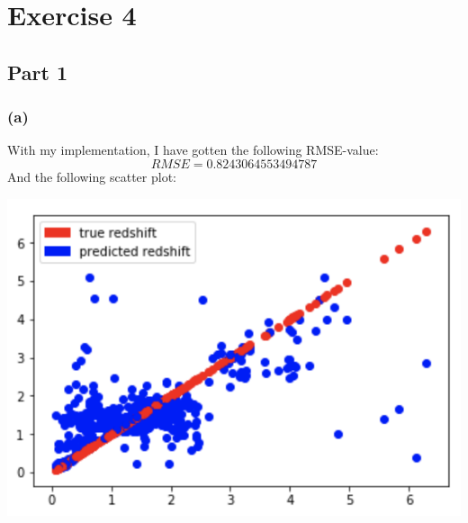 \documentclass{report}
\begin{document}
\section*{Exercise 4}
\subsection*{Part 1}
\subsubsection*{(a)}
With my implementation, I have gotten the following RMSE-value:
$$RMSE = 0.8243064553494787$$
And the following scatter plot:
\begin{center}
    \includegraphics[height = 7 cm]{kNN_Scatter_a}
\end{center}
\end{document}
